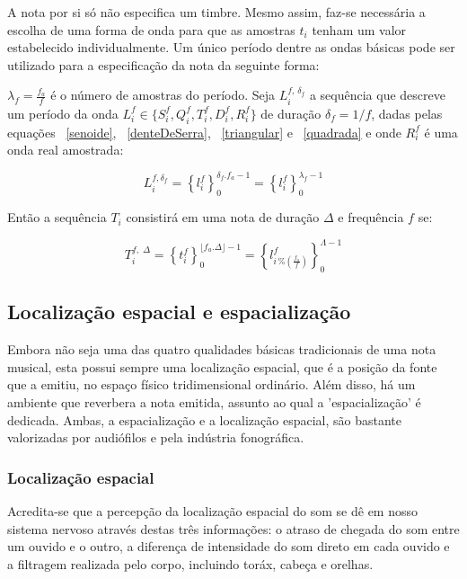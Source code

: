 A nota por si só não especifica um timbre. Mesmo assim, faz-se necessária a escolha de uma forma de onda para que as amostras $t_i$ tenham um valor estabelecido individualmente. Um único período dentre as ondas básicas pode ser utilizado para a especificação da nota da seguinte forma:

$\lambda_f=\frac{f_a}{f}$ é o número de amostras do período. Seja $L_i^{f,\, \delta_f} $
a sequência que descreve um período da onda $L_i^f \in \{S_i^f,Q_i^f,T_i^f,D_i^f,R_i^f \}$ de duração 
$\delta_f=1/f$, dadas pelas equações ~\ref{senoide}, ~\ref{denteDeSerra}, ~\ref{triangular} e ~\ref{quadrada} e onde $R_i^f$ é
uma onda real amostrada:

\begin{equation}\label{periodoUnico}
L_i^{f , \delta_f } = \left\{ l_i^f \right\}_0^{\delta_f . f_a -1}=\left\{ l_i^f \right\}_0^{\lambda_f-1}
\end{equation}

Então a sequência $T_i$ consistirá em uma nota de duração $\Delta$ e frequência $f$ se:

\begin{equation}\label{eq:notaBasicaTimbre}
T_i^{f,\; \Delta}=\left\{t_i^f\right\}_0^{\lfloor f_a . \Delta \rfloor -1}=\left \{ l^f_{i\,\%\left(\frac{f_a}{f}\right)} \right \}_0^{\Lambda-1}
\end{equation}

\subsection{Localização espacial e espacialização}\label{subsec:spac}
Embora não seja uma das quatro qualidades básicas tradicionais de uma nota musical, esta possui sempre uma localização espacial, que é a posição da fonte que a emitiu, no espaço físico tridimensional ordinário. Além disso, há um ambiente que reverbera a nota emitida, assunto ao qual a 'espacialização' é dedicada. Ambas, a espacialização e a localização espacial, são bastante valorizadas
 por audiófilos e pela indústria fonográfica.\cite{floEsp}

 \subsubsection{Localização espacial}
Acredita-se que a percepção da localização espacial do som se dê em nosso sistema nervoso através destas
três informações: o atraso de chegada do som entre um ouvido e o outro, a diferença de intensidade do som direto em cada ouvido e a 
filtragem realizada pelo corpo, incluindo toráx, cabeça e orelhas.\cite{Roederer, hrtf, Heeger}


